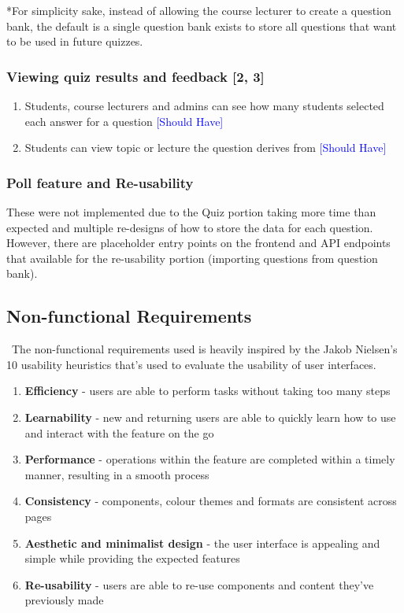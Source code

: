 *For simplicity sake, instead of allowing the course lecturer to create a question bank, the default is a single question bank exists to store all questions that want to be used in future quizzes. 

\subsubsection{Viewing quiz results and feedback [2, 3]}
\begin{enumerate}
	\item Students, course lecturers and admins can see how many students selected each answer for a question \textcolor{Blue}{[Should Have]}
	\item Students can view topic or lecture the question derives from \textcolor{Blue}{[Should Have]}
\end{enumerate}

\subsubsection{Poll feature and Re-usability}
These were not implemented due to the Quiz portion taking more time than expected and multiple re-designs of how to store the data for each question. However, there are placeholder entry points on the frontend and API endpoints that available for the re-usability portion (importing questions from question bank).


\subsection{Non-functional Requirements}\
The non-functional requirements used is heavily inspired by the Jakob Nielsen's 10 usability heuristics that's used to evaluate the usability of user interfaces. 

\begin{enumerate}
	\item \textbf{Efficiency} - users are able to perform tasks without taking too many steps
	\item \textbf{Learnability} - new and returning users are able to quickly learn how to use and interact with the feature on the go
	\item \textbf{Performance} - operations within the feature are completed within a timely manner, resulting in a smooth process
	\item \textbf{Consistency} - components, colour themes and formats are consistent across pages 
	\item \textbf{Aesthetic and minimalist design} - the user interface is appealing and simple while providing the expected features
	\item \textbf{Re-usability} - users are able to re-use components and content they've previously made
\end{enumerate}

